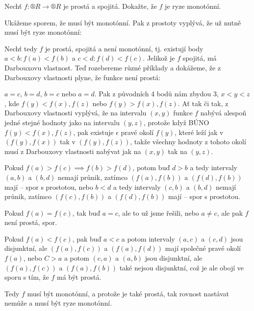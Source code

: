 \documentclass[12pt]{article}					%
\begin{document}
\begin{priklad}
    Nechť $f: ®R \rightarrow ®R$ je prostá a spojitá. Dokažte, že $f$ je ryze monotónní.

    \begin{dukazin}
        Ukážeme sporem, že musí být monotónní. Pak z prostoty vyplývá, že už nutně musí být ryze monotónní:

        Nechť tedy $f$ je prostá, spojitá a není monotónní, tj. existují body $a < b: f(a) < f(b)$ a $c < d: f(d) < f(c)$. Jelikož je $f$ spojitá, má Darbouxovu vlastnost. Teď rozebereme různé příklady a dokážeme, že z Darbouxovy vlastnosti plyne, že funkce není prostá:

        $a = c$, $b = d$, $b = c$ nebo $a = d$. Pak z původních 4 bodů nám zbydou 3, $x < y < z$, kde $f(y) < f(x), f(z)$ nebo $f(y) > f(x), f(z)$. Ať tak či tak, z Darbouxovy vlastnosti vyplývá, že na intervalu $(x, y)$ funkce $f$ nabývá alespoň jedné stejné hodnoty jako na intervalu $(y, z)$, protože když BÚNO $f(y) < f(x), f(z)$, pak existuje $\epsilon$ pravé okolí $f(y)$, které leží jak v $(f(y), f(x))$ tak v $(f(y), f(z))$, takže všechny hodnoty z tohoto okolí musí z Darbouxovy vlastnosti nabývat jak na $(x, y)$ tak na $(y, z)$.

        Pokud $f(a) > f(c) \implies f(b) > f(d)$, potom buď $d > b$ a tedy intervaly $(a, b)$ a $(b, d)$ nemají průnik, zatímco $(f(a), f(b))$ a $(f(d), f(b))$ mají -- spor s prostotou, nebo $b < d$ a tedy intervaly $(c, b)$ a $(b, d)$ nemají průnik, zatímco $(f(c), f(b))$ a $(f(d), f(b))$ mají -- spor s prostotou.

        Pokud $f(a) = f(c)$, tak buď $a = c$, ale to už jsme řešili, nebo $a ≠ c$, ale pak $f$ není prostá, spor.

        Pokud $f(a) < f(c)$, pak buď $a < c$ a potom intervaly $(a, c)$ a $(c, d)$ jsou disjunktní, ale $(f(a), f(c))$ a $(f(a), f(d))$ mají společné pravé okolí $f(a)$, nebo $C > a$ a potom $(c, a)$ a $(a, b)$ jsou disjunktní, ale $(f(a), f(c))$ a $(f(a), f(b))$ také nejsou disjunktní, což je ale obojí ve sporu s tím, že $f$ má být prostá.

        Tedy $f$ musí být monotónní, a protože je také prostá, tak rovnost nastávat nemůže a musí být ryze monotónní.
    \end{dukazin}
\end{priklad}
\end{document}
